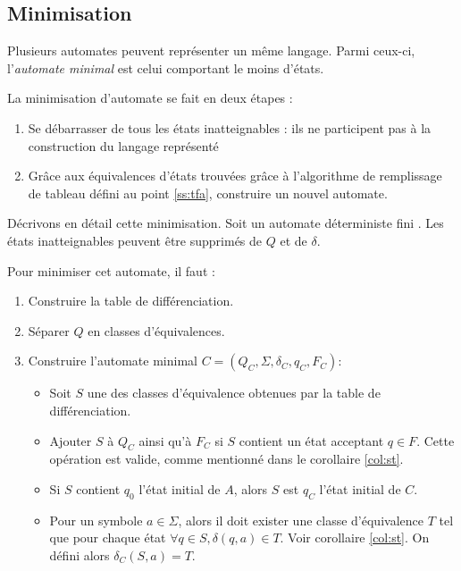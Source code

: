 \subsection{Minimisation}

Plusieurs automates peuvent représenter un même langage. Parmi ceux-ci, l'\emph{automate minimal} est celui comportant le moins d'états.


La minimisation d'automate se fait en deux étapes :
\begin{enumerate}
 \item Se débarrasser de tous les états inatteignables : ils ne participent pas à la construction du langage représenté
 \item Grâce aux équivalences d'états trouvées grâce à l'algorithme de remplissage de tableau défini au point \ref{ss:tfa}, construire un nouvel automate.
\end{enumerate}

Décrivons en détail cette minimisation.
Soit un automate déterministe fini \automaton. Les états inatteignables peuvent être supprimés de $Q$ et de $\delta$.

Pour minimiser cet automate, il faut :
\begin{enumerate}
 \item Construire la table de différenciation.
 \item Séparer $Q$ en classes d'équivalences.
 \item Construire l'automate minimal $C=(Q_C,\Sigma, \delta_C, q_C, F_C)$:
 \begin{itemize}
	 \item Soit $S$ une des classes d'équivalence obtenues par la table de différenciation.
	 \item Ajouter $S$ à $Q_C$ ainsi qu'à $F_C$ si $S$ contient un état acceptant $q\in F$. Cette opération est valide, comme mentionné dans le corollaire \ref{col:st}.
	 \item Si $S$ contient $q_0$ l'état initial de $A$, alors $S$ est $q_C$ l'état initial de $C$.
	 \item Pour un symbole $a \in \Sigma$, alors il doit exister une classe d'équivalence $T$ tel que pour chaque état $\forall q \in S,\delta(q,a) \in T$. Voir corollaire \ref{col:st}. On défini alors $\delta_C(S,a)=T$.
 \end{itemize}
\end{enumerate}


